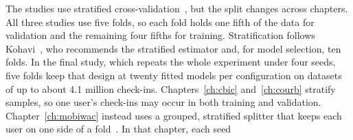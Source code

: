 The studies use stratified cross-validation~\cite{kohavi1995crossval}, but the
split changes across chapters.
All three studies use five folds, so each fold holds one fifth of the data for
validation and the remaining four fifths for training. Stratification follows
Kohavi~\cite{kohavi1995crossval}, who recommends the stratified estimator and, for model
selection, ten folds. In the final study, which repeats the whole experiment under four
seeds, five folds keep that design at twenty fitted models per configuration on datasets
of up to about 4.1 million check-ins.
Chapters~\ref{ch:cbic} and~\ref{ch:courb} stratify
samples, so one user's check-ins may occur in both training and validation.
Chapter~\ref{ch:mobiwac} instead uses a grouped, stratified splitter that keeps each
user on one side of a fold~\cite{pedregosa2011sklearn}. In that chapter, each seed
